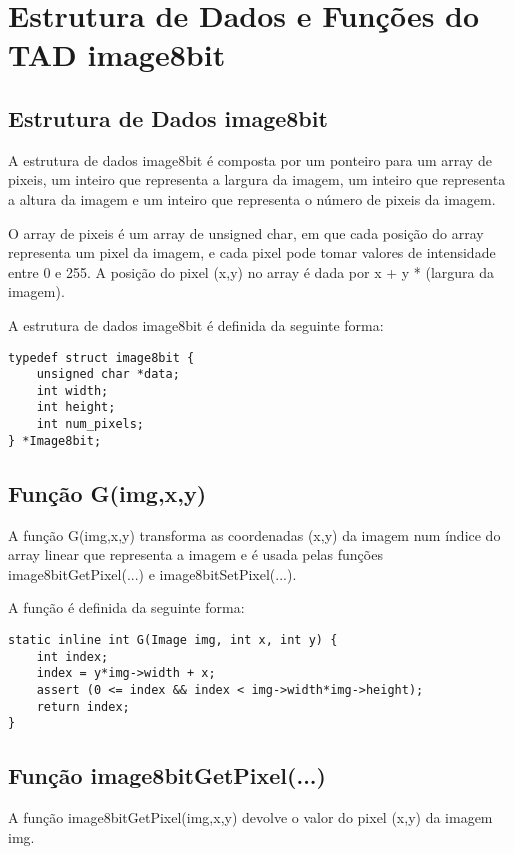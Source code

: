 \documentclass{report}
\begin{document}
\chapter{Estrutura de Dados e Funções do TAD image8bit}

\section{Estrutura de Dados image8bit}

A estrutura de dados image8bit é composta por um ponteiro para um array de pixeis, um inteiro que representa a largura da imagem, um inteiro que representa a altura da imagem e um inteiro que representa o número de pixeis da imagem.
\par
O array de pixeis é um array de unsigned char, em que cada posição do array representa um pixel da imagem, e cada pixel pode tomar valores de intensidade entre 0 e 255. A posição do pixel (x,y) no array é dada por x + y * (largura da imagem).
\par
A estrutura de dados image8bit é definida da seguinte forma:

\begin{lstlisting}
typedef struct image8bit {
    unsigned char *data;
    int width;
    int height;
    int num_pixels;
} *Image8bit;
\end{lstlisting}


\section{Função G(img,x,y)}

A função G(img,x,y) transforma as coordenadas (x,y) da imagem num índice do array linear que representa a imagem e é usada pelas funções image8bitGetPixel(...) e image8bitSetPixel(...).
\par

\par
A função é definida da seguinte forma:

\begin{lstlisting}
static inline int G(Image img, int x, int y) {
    int index;
    index = y*img->width + x;
    assert (0 <= index && index < img->width*img->height);
    return index;
}
\end{lstlisting}

\section{Função image8bitGetPixel(...)}
A função image8bitGetPixel(img,x,y) devolve o valor do pixel (x,y) da imagem img.
\par
\end{document}
